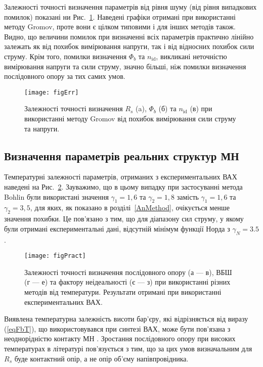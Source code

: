 Залежності точності визначення параметрів від рівня шуму (від рівня випадкових помилок) показані ни Рис.~\ref{figErr}.
Наведені графіки отримані при використанні методу Gromov, проте вони є цілком типовими і для інших методів також.
Видно, що величини помилок при визначенні всіх параметрів практично лінійно залежать як від похибок вимірювання напруги, так і від відносних похибок сили струму.
Крім того, помилки визначення $\Phi_b$ та $n_\mathrm{id}$, викликані неточністю вимірювання напруги та сили струму, значно більші, ніж помилки визначення послідовного опору за тих самих умов.


\begin{figure}
\texttt{[image: figErr]}%
\caption{\label{figErr}
Залежності точності визначення $R_s$ (a), $\Phi_b$ (б) та $n_\mathrm{id}$ (в) при використанні методу Gromov  від похибок вимірювання сили струму та напруги.
}
\end{figure}


\subsection{Визначення параметрів реальних структур МН}

Температурні залежності параметрів, отриманих з експериментальних ВАХ наведені на Рис.~\ref{figPract}.
Зауважимо, що в цьому випадку при застосуванні метода Bohlin були використані значення $\gamma_1=1,6$ та $\gamma_2=1,8$ замість  $\gamma_1=1,6$ та $\gamma_2=3,5$, для яких, як показано в розділі~\ref{AnMethod}, очікується менше значення похибки.
Це пов'язано з тим, що для діапазону сил струму, у якому були отримані експериментальні дані, відсутній мінімум функції Норда з $\gamma_N=3.5$.



\begin{figure}
\center
\texttt{[image: figPract]}%
\caption{\label{figPract}
Залежності точності визначення послідовного опору (а --- в), ВБШ (г --- е) та фактору неідеальності (є --- з) при використанні різних методів від температури.
Результати отримані при використанні експериментальних ВАХ.
}
\end{figure}

Виявлена температурна залежність висоти бар'єру, які відрізняється від виразу (\ref{eqFbT}), що використовувався при синтезі ВАХ, може бути пов'язана з неоднорідністю контакту МН \cite{Tung:MSE,Olikh:2013IEEE}.
Зростання послідовного опору при високих температурах в літературі \cite{Rs:Dokme} пов'язується з тим, що за цих умов визначальним для $R_s$ буде контактний опір, а не опір об'єму напівпровідника.

